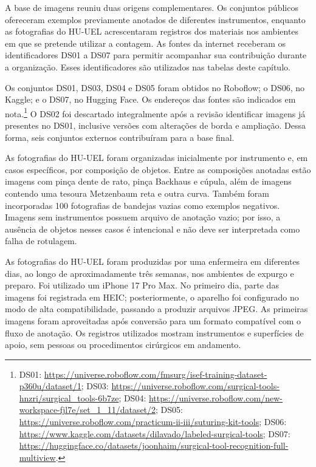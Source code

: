 A base de imagens reuniu duas origens complementares. Os conjuntos públicos ofereceram exemplos previamente anotados de diferentes instrumentos, enquanto as fotografias do HU-UEL acrescentaram registros dos materiais nos ambientes em que se pretende utilizar a contagem. As fontes da internet receberam os identificadores DS01 a DS07 para permitir acompanhar sua contribuição durante a organização. Esses identificadores são utilizados nas tabelas deste capítulo.

Os conjuntos DS01, DS03, DS04 e DS05 foram obtidos no Roboflow; o DS06, no Kaggle; e o DS07, no Hugging Face. Os endereços das fontes são indicados em nota.\footnote{DS01: \url{https://universe.roboflow.com/fmsurg/isef-training-dataset-p360u/dataset/1}; DS03: \url{https://universe.roboflow.com/surgical-tools-hnzri/surgical_tools-6b7ze}; DS04: \url{https://universe.roboflow.com/new-workspace-fjl7e/set_1_11/dataset/2}; DS05: \url{https://universe.roboflow.com/practicum-ii-iii/suturing-kit-tools}; DS06: \url{https://www.kaggle.com/datasets/dilavado/labeled-surgical-tools}; DS07: \url{https://huggingface.co/datasets/joonhaim/surgical-tool-recognition-full-multiview}.} O DS02 foi descartado integralmente após a revisão identificar imagens já presentes no DS01, inclusive versões com alterações de borda e ampliação. Dessa forma, seis conjuntos externos contribuíram para a base final.

As fotografias do HU-UEL foram organizadas inicialmente por instrumento e, em casos específicos, por composição de objetos. Entre as composições anotadas estão imagens com pinça dente de rato, pinça Backhaus e cúpula, além de imagens contendo uma tesoura Metzenbaum reta e outra curva. Também foram incorporadas 100 fotografias de bandejas vazias como exemplos negativos. Imagens sem instrumentos possuem arquivo de anotação vazio; por isso, a ausência de objetos nesses casos é intencional e não deve ser interpretada como falha de rotulagem.

As fotografias do HU-UEL foram produzidas por uma enfermeira em diferentes dias, ao longo de aproximadamente três semanas, nos ambientes de expurgo e preparo. Foi utilizado um iPhone 17 Pro Max. No primeiro dia, parte das imagens foi registrada em HEIC; posteriormente, o aparelho foi configurado no modo de alta compatibilidade, passando a produzir arquivos JPEG. As primeiras imagens foram aproveitadas após conversão para um formato compatível com o fluxo de anotação. Os registros utilizados mostram instrumentos e superfícies de apoio, sem pessoas ou procedimentos cirúrgicos em andamento.

